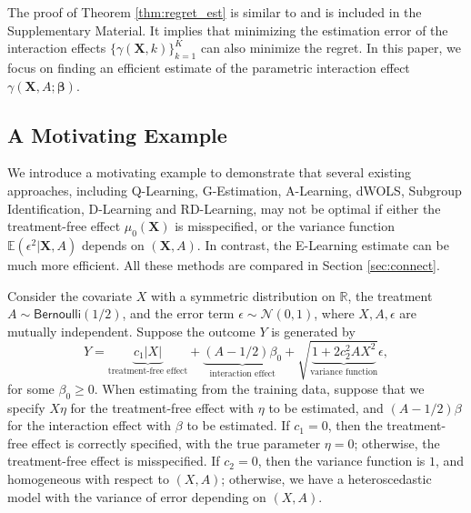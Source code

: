 \documentclass[11pt]{article}
\theoremstyle{definition}
\theoremstyle{remark}
\newcommand{\bX}{\bm{X}}
\newcommand{\bbeta}{\bm{\beta}}
\newcommand{\bbE}{\mathbb{E}}
\newcommand{\bbR}{\mathbb{R}}
\newcommand{\cN}{\mathcal{N}}
\newcommand{\bern}{\mathsf{Bernoulli}}
\begin{document}
The proof of Theorem \ref{thm:regret_est} is similar to \citet[Lemma 2]{murphy2005generalization} and is included in the Supplementary Material. It implies that minimizing the estimation error of the interaction effects $ \{\gamma(\bX,k)\}_{k=1}^{K} $ can also minimize the regret. In this paper, we focus on finding an efficient estimate of the parametric interaction effect $ \gamma(\bX,A;\bbeta) $.

\subsection{A Motivating Example}\label{sec:eg}

We introduce a motivating example to demonstrate that several existing approaches, including Q-Learning, G-Estimation, A-Learning, dWOLS, Subgroup Identification, D-Learning and RD-Learning, may not be optimal if either the treatment-free effect $ \mu_{0}(\bX) $ is misspecified, or the variance function $ \bbE(\epsilon^{2}|\bX,A) $ depends on $ (\bX,A) $. In contrast, the E-Learning estimate can be much more efficient. All these methods are compared in Section \ref{sec:connect}.

Consider the covariate $ X $ with a symmetric distribution on $ \bbR $, the treatment $ A \sim \bern(1/2) $, and the error term $ \epsilon \sim \cN(0,1) $, where $ X,A,\epsilon $ are mutually independent. Suppose the outcome $ Y $ is generated by
\[ Y = \underbrace{c_{1}|X|}_{\text{treatment-free effect}} + \underbrace{(A-1/2)\beta_{0}}_{\text{interaction effect}} + \sqrt{\underbrace{1+2c_{2}^{2}AX^{2}}_{\text{variance function}}}\epsilon, \]
for some $ \beta_{0} \ge 0 $. When estimating from the training data, suppose that we specify $ X\eta $ for the treatment-free effect with $ \eta $ to be estimated, and $ (A-1/2)\beta $ for the interaction effect with $ \beta $ to be estimated. If $ c_{1} = 0 $, then the treatment-free effect is correctly specified, with the true parameter $ \eta = 0 $; otherwise, the treatment-free effect is misspecified. If $ c_{2} = 0 $, then the variance function is $ 1 $, and homogeneous with respect to $ (X,A) $; otherwise, we have a heteroscedastic model with the variance of error depending on $ (X,A) $.
\end{document}
